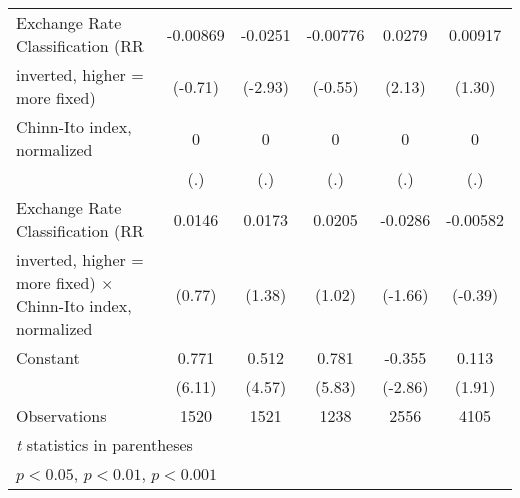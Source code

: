 {\begin{tabular}{l*{5}{c}}
Exchange Rate Classification (RR        &  -0.00869         &   -0.0251\sym{**} &  -0.00776         &    0.0279\sym{*}  &   0.00917         \\
inverted, higher = more fixed)          &   (-0.71)         &   (-2.93)         &   (-0.55)         &    (2.13)         &    (1.30)         \\
\addlinespace
Chinn-Ito index, normalized             &         0         &         0         &         0         &         0         &         0         \\
                                        &       (.)         &       (.)         &       (.)         &       (.)         &       (.)         \\
\addlinespace
Exchange Rate Classification (RR        &    0.0146         &    0.0173         &    0.0205         &   -0.0286         &  -0.00582         \\
inverted, higher = more fixed) $\times$ Chinn-Ito index, normalized&    (0.77)         &    (1.38)         &    (1.02)         &   (-1.66)         &   (-0.39)         \\
\addlinespace
Constant                                &     0.771\sym{***}&     0.512\sym{***}&     0.781\sym{***}&    -0.355\sym{**} &     0.113         \\
                                        &    (6.11)         &    (4.57)         &    (5.83)         &   (-2.86)         &    (1.91)         \\
\midrule
Observations                            &      1520         &      1521         &      1238         &      2556         &      4105         \\
\bottomrule
\multicolumn{6}{l}{\footnotesize \textit{t} statistics in parentheses}\\
\multicolumn{6}{l}{\footnotesize \sym{*} \(p<0.05\), \sym{**} \(p<0.01\), \sym{***} \(p<0.001\)}\\
\end{tabular}
}
